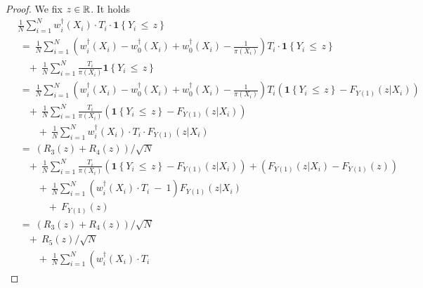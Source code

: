 \nopagebreak
\begin{proof}
  We fix $z\in\mathbb{R}$.
  It holds
  \begin{align*}
    &
    \frac{1}{N}
    \sum_{i=1}^{N} 
    w^\dagger_i(X_i)
    \cdot
    T_i
    \cdot
    \mathbf{1}{\left\{ Y_i\, \le\, z \right\}}
    \\
    &
    \ 
    =
    \ 
    \frac{1}{N}
    \sum_{i=1}^{N} 
    \left( 
    w^\dagger_i(X_i)
    -
    w^\dagger_0(X_i)
    +
    w^\dagger_0(X_i)
    -
    \frac{1}{\pi(X_i)}
    \right)
    T_i
    \cdot
    \mathbf{1}{\left\{ Y_i\, \le\, z \right\}}
    \\
    &
    \quad 
    +
    \ 
    \frac{1}{N}
    \sum_{i=1}^{N} 
    \frac{T_i}{\pi(X_i)}
    \mathbf{1}{\left\{ Y_i\, \le\, z \right\}}
    \\
    &
    \ 
    =
    \ 
    \frac{1}{N}
    \sum_{i=1}^{N} 
    \left( 
    w^\dagger_i(X_i)
    -
    w^\dagger_0(X_i)
    +
    w^\dagger_0(X_i)
    -
    \frac{1}{\pi(X_i)}
    \right)
    T_i
    \left( 
    \mathbf{1}{\left\{ Y_i\, \le\, z \right\}}
    -
    F_{Y(1)}(z|X_i)
    \right)
    \\
    &
    \quad 
    +
    \ 
    \frac{1}{N}
    \sum_{i=1}^{N} 
    \frac{T_i}{\pi(X_i)}
    \left( 
    \mathbf{1}{\left\{ Y_i\, \le\, z \right\}}
    -
    F_{Y(1)}(z|X_i)
    \right)
    \\
    &
    \qquad 
    +
    \ 
    \frac{1}{N}
    \sum_{i=1}^{N} 
    w^\dagger_i(X_i)\cdot T_i\cdot
    F_{Y(1)}(z|X_i)
    \\
    &
    \ 
    =
    \ 
    (
    R_3(z)+R_4(z)
    )
    /\sqrt{N}
    \\
    &
    \quad 
    +
    \ 
    \frac{1}{N}
    \sum_{i=1}^{N} 
    \frac{T_i}{\pi(X_i)}
    \left( 
    \mathbf{1}{\left\{ Y_i\, \le\, z \right\}}
    -
    F_{Y(1)}(z|X_i)
    \right)
    +
    \left( 
    F_{Y(1)}(z|X_i)
    -
    F_{Y(1)}(z)
    \right)
    \\
    &
    \qquad
    +
    \ 
    \frac{1}{N}
    \sum_{i=1}^{N} 
    \left( 
    w^\dagger_i(X_i)\cdot T_i
    \ 
    -
    \ 
    1
    \right)
    F_{Y(1)}(z|X_i)
    \\
    &
    \quad\qquad
    +
    \ 
    F_{Y(1)}(z)
    \\
    &
    \ 
    =
    \ 
    (
    R_3(z)+R_4(z)
    )
    /\sqrt{N}
    \\
    &
    \quad
    +
    \ 
    R_5(z)/\sqrt{N}
    \\
    &
    \qquad
    +
    \ 
    \frac{1}{N}
    \sum_{i=1}^{N} 
    \left( 
    w^\dagger_i(X_i)\cdot T_i

\end{align*}
\end{proof}
